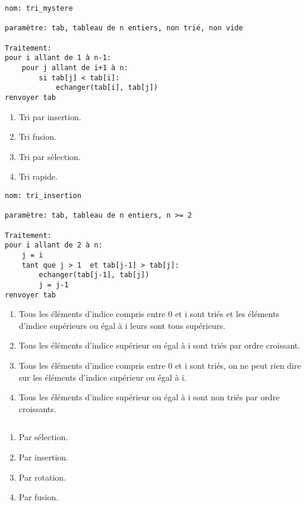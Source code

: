 \begin{lstlisting}
nom: tri_mystere

paramètre: tab, tableau de n entiers, non trié, non vide

Traitement:
pour i allant de 1 à n-1:
    pour j allant de i+1 à n:
        si tab[j] < tab[i]:
            echanger(tab[i], tab[j])
renvoyer tab
\end{lstlisting}
\begin{enumerate}
\item Tri par insertion. 
\item Tri fusion.
\item Tri par sélection. %
\item Tri rapide.
\end{enumerate}

\begin{lstlisting}
nom: tri_insertion

paramètre: tab, tableau de n entiers, n >= 2

Traitement:
pour i allant de 2 à n:
    j = i
    tant que j > 1  et tab[j-1] > tab[j]:
        echanger(tab[j-1], tab[j])
        j = j-1
renvoyer tab
\end{lstlisting}
\begin{enumerate}
\item Tous les éléments d'indice compris entre 0 et i sont triés et les éléments d'indice supérieurs ou égal à i leurs sont tous supérieurs.
\item Tous les éléments d'indice supérieur ou égal à i sont triés par ordre croissant.
\item Tous les éléments d'indice compris entre 0 et i sont triés, on ne peut rien dire sur les éléments d'indice supérieur ou égal à i. %
\item Tous les éléments d'indice supérieur ou égal à i sont non triés par ordre croissants.
\end{enumerate}

\begin{lstlisting}
\end{lstlisting}
\begin{enumerate}
\item Par sélection.
\item Par insertion.
\item Par rotation. %
\item Par fusion.
\end{enumerate}
